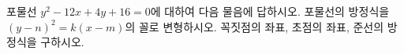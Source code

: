 포물선 $y^2-12x+4y+16=0$에 대하여 다음 물음에 답하시오.
 포물선의 방정식을 $(y-n)^2=k(x-m)$의 꼴로 변형하시오.
 꼭짓점의 좌표, 초점의 좌표, 준선의 방정식을 구하시오.
